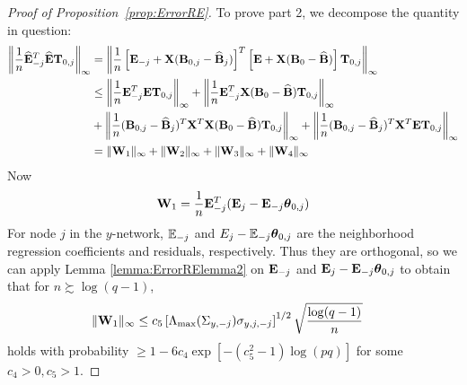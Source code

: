 \documentclass[12pt, letterpaper]{article}
\theoremstyle{definition}
\numberwithin{equation}{section}
\begin{document}
\begin{proof}[Proof of Proposition~\ref{prop:ErrorRE}]
To prove part 2, we decompose the quantity in question:
%
\begin{align}\label{eqn:ErrorRElemma2maineqn}
\left\| \frac{1}{n} \widehat {{\mathbf{E}}}_{-j}^T \widehat {{\mathbf{E}}} {\mathbf{T}}_{0,j} \right\|_\infty &=
\left\| \frac{1}{n} \left[ {\mathbf{E}}_{-j} + {\mathbf{X}} ({\mathbf{B}}_{0,j} - \widehat {{\mathbf{B}}}_j) \right]^T \left[ {\mathbf{E}} + {\mathbf{X}} ({\mathbf{B}}_0 - \widehat {{\mathbf{B}}}) \right] {\mathbf{T}}_{0,j} \right\|_\infty \notag\\
& \leq \left\| \frac{1}{n} {\mathbf{E}}_{-j}^T {\mathbf{E}} {\mathbf{T}}_{0,j} \right\|_\infty +
\left\| \frac{1}{n} {\mathbf{E}}_{-j}^T {\mathbf{X}} ({\mathbf{B}}_0 - \widehat {{\mathbf{B}}}) {\mathbf{T}}_{0,j} \right\|_\infty \notag\\
& + \left\| \frac{1}{n} ({\mathbf{B}}_{0,j} - \widehat {{\mathbf{B}}}_j)^T {\mathbf{X}}^T {\mathbf{X}} ({\mathbf{B}}_0 - \widehat {{\mathbf{B}}}) {\mathbf{T}}_{0,j} \right\|_\infty +
\left\| \frac{1}{n} ({\mathbf{B}}_{0,j} - \widehat {{\mathbf{B}}}_j)^T {\mathbf{X}}^T {\mathbf{E}} {\mathbf{T}}_{0,j} \right\|_\infty \notag\\
&= \| {\mathbf{W}}_1 \|_\infty + \| {\mathbf{W}}_2 \|_\infty + \| {\mathbf{W}}_3 \|_\infty + \| {\mathbf{W}}_4 \|_\infty
\end{align}
%
Now
%
$$
{\mathbf{W}}_1 = \frac{1}{n} {\mathbf{E}}_{-j}^T ( {\mathbf{E}}_j - {\mathbf{E}}_{-j} {\boldsymbol{\theta}}_{0,j})
$$
%
For node $j$ in the $y$-network, ${\mathbb{E}}_{-j}$ and $E_j - {\mathbb{E}}_{-j} {\boldsymbol{\theta}}_{0,j}$ are the neighborhood regression coefficients and residuals, respectively. Thus they are orthogonal, so we can apply Lemma \ref{lemma:ErrorRElemma2} on ${\mathbf{E}}_{-j}$ and ${\mathbf{E}}_j - {\mathbf{E}}_{-j} {\boldsymbol{\theta}}_{0,j}$ to obtain that for $n \succsim \log (q-1)$,
%
\begin{align}\label{eqn:ErrorRElemma2eqn5}
\| {\mathbf{W}}_1 \|_\infty & \leq c_5 \left[ \Lambda_{\max} ( \Sigma_{y,-j}) \sigma_{y,j,-j} \right]^{1/2} \sqrt{\frac{\log(q-1)}{n}}
\end{align}
%
holds with probability $\geq 1 - 6c_4 \exp [-(c_5^2-1) \log(pq)]$ for some $c_4 > 0, c_5 > 1$.
%


\end{proof}
\end{document}

